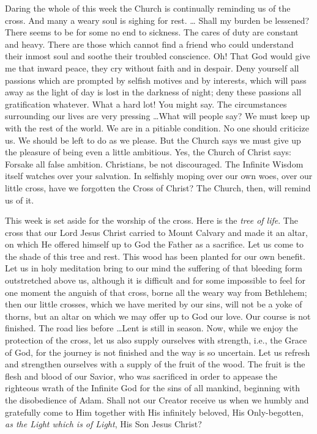 Daring the whole of this week the Church is 
continually reminding us of the cross. And 
many a weary soul is sighing for rest. \ldots 
Shall my burden be lessened? There seems to 
be for some no end to sickness. The cares of 
duty are constant and heavy. There are those 
which cannot find a friend who could understand
their inmost soul and soothe their troubled 
conscience. Oh! That God would give me that 
inward peace, they cry without faith and in despair.
Deny yourself all passions which are 
prompted by selfish motives and by interests, 
which will pass away as the light of day is lost 
in the darkness of night; deny these passions 
all gratification whatever. What a hard lot! 
You might say. The circumstances surrounding
our lives are very pressing \ldots What will 
people say? We must keep up with the rest of 
the world. We are in a pitiable condition. No
one should criticize us. We should be left to 
do as we please. But the Church says we must 
give up the pleasure of being even a little 
ambitious. Yes, the Church of Christ says: 
Forsake all false ambition. Christians, be not 
discouraged. The Infinite Wisdom itself watches 
over your salvation. In selfishly moping over 
our own woes, over our little cross, have we forgotten
the Cross of Christ? The Church, then, 
will remind us of it. 

This week is set aside for the worship of the 
cross. Here is the \textit{tree of life}. The cross that 
our Lord Jesus Christ carried to Mount Calvary 
and made it an altar, on which He offered himself
up to God the Father as a sacrifice. Let us 
come to the shade of this tree and rest. This wood 
has been planted for our own benefit. Let us in 
holy meditation bring to our mind the suffering 
of that bleeding form outstretched above us, 
although it is difficult and for some impossible 
to feel for one moment the anguish of that 
cross, borne all the weary way from Bethlehem; 
then our little crosses, which we have merited 
by our sins, will not be a yoke of thorns, but 
an altar on which we may offer up to God our 
love. Our course is not finished. The road lies 
before \ldots Lent is still in season. Now, while 
we enjoy the protection of the cross, let us also
supply ourselves with strength, i.e., the Grace 
of God, for the journey is not finished and 
the way is so uncertain. Let us refresh and 
strengthen ourselves with a supply of the fruit 
of the wood. The fruit is the flesh and blood 
of our Savior, who was sacrificed in order to 
appease the righteous wrath of the Infinite God 
for the sins of all mankind, beginning with the 
disobedience of Adam. Shall not our Creator 
receive us when we humbly and gratefully come 
to Him together with His infinitely beloved, 
His Only-begotten, \textit{as the Light which is of 
Light}, His Son Jesus Christ? 

